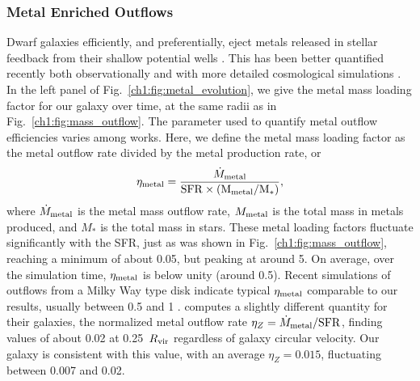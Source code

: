 \subsubsection{Metal Enriched Outflows}
Dwarf galaxies efficiently, and preferentially, eject metals released in stellar feedback from their shallow potential wells \citep{MacLowFerrara1999,FerraraTolstoy2000}. This has been better quantified recently both observationally \citep[e.g.][]{Kirby2011-metals,Zahid2012,Peeples2014,McQuinn2015} and with more detailed cosmological simulations \citep{Simpson2013,Angles-Alcazar2017,Muratov2017}. In the left panel of Fig.~\ref{ch1:fig:metal_evolution}, we give the metal mass loading factor for our galaxy over time, at the same radii as in Fig.~\ref{ch1:fig:mass_outflow}. The parameter used to quantify metal outflow efficiencies varies among works. Here, we define the metal mass loading factor as the metal outflow rate divided by the metal production rate, or
\begin{equation} \label{eq:eta-metal}
\eta_{\rm metal} = \frac{\dot{M}_{\rm metal}}{\rm{SFR} \times (M_{\rm metal}/M_{*})},
\end{equation}
where $\dot{M}_{\rm metal}$ is the metal mass outflow rate, $M_{\rm metal}$ is the total mass in metals produced, and $M_{*}$ is the total mass in stars. These metal loading factors fluctuate significantly with the SFR, just as was shown in Fig.~\ref{ch1:fig:mass_outflow}, reaching a minimum of about 0.05, but peaking at around 5. On average, over the simulation time, $\eta_{\rm metal}$ is below unity (around 0.5). Recent simulations of outflows from a Milky Way type disk indicate typical $\eta_{\rm metal}$ comparable to our results, usually between 0.5 and 1 \citep{Li2017,Fielding2017}. \cite{Muratov2017} computes a slightly different quantity for their galaxies, the normalized metal outflow rate $\eta_{Z} = \dot{M}_{\rm metal}/{\rm SFR}$, finding values of about 0.02 at 0.25~$R_{\rm vir}$ regardless of galaxy circular velocity. Our galaxy is consistent with this value, with an average $\eta_Z = 0.015$, fluctuating between 0.007 and 0.02.

